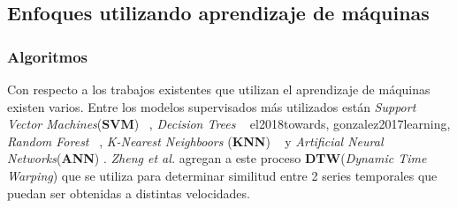 
	\subsection{Enfoques utilizando aprendizaje de máquinas}
		\subsubsection{Algoritmos}
			Con respecto a los trabajos existentes que utilizan el aprendizaje de máquinas existen varios. Entre los modelos supervisados
			más utilizados están \emph{Support Vector Machines}(\textbf{SVM}) ~, \emph{Decision Trees} ~\brackcite
				{el2018towards, gonzalez2017learning}, \emph{Random Forest} ~, \emph{K-Nearest Neighboors}
				(\textbf{KNN}) ~ y \emph{Artificial Neural Networks}(\textbf{ANN})
				. \emph{Zheng et al.}  agregan
				a este proceso \textbf{DTW}(\emph{Dynamic Time Warping}) que se utiliza para determinar similitud entre 2 series temporales que
				puedan ser obtenidas a distintas velocidades.

